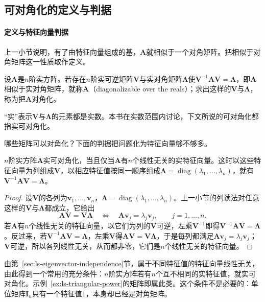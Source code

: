 \subsection{可对角化的定义与判据}

\paragraph{定义与特征向量判据}
上一小节说明，有了由特征向量组成的基，$\bm A$就相似于一个对角矩阵。把相似于对角矩阵这一性质取作定义。
\begin{definition}[实可对角化]
\label{def:ls-real-diagonalizable}
设$\bm A$是$n$阶实方阵。若存在$n$阶实可逆矩阵$\bm V$与实对角矩阵$\bm\Lambda$使$\bm V^{-1}\bm A\bm V=\bm\Lambda$，即$\bm A$相似于实对角矩阵，就称$\bm A$（diagonalizable over the reals）；求出这样的$\bm V$与$\bm\Lambda$，称为把$\bm A$对角化。
\end{definition}
“实”表示$\bm V$与$\bm\Lambda$的元素都是实数。本书在实数范围内讨论，下文所说的可对角化都指实可对角化。

哪些矩阵可以对角化？下面的判据把问题化为特征向量够不够多。
\begin{theorem}[对角化判据]
\label{thm:ls-diagonalization-criterion}
$n$阶实方阵$\bm A$实可对角化，当且仅当$\bm A$有$n$个线性无关的实特征向量。这时以这些特征向量为列组成$\bm V$，以相应特征值按同一顺序组成$\bm\Lambda=\operatorname{diag}(\lambda_1,\ldots,\lambda_n)$，就有$\bm V^{-1}\bm A\bm V=\bm\Lambda$。
\end{theorem}
\begin{proof}
设$\bm V$的各列为$\bm v_1,\ldots,\bm v_n$，$\bm\Lambda=\operatorname{diag}(\lambda_1,\ldots,\lambda_n)$。上一小节的列读法对任意这样的$\bm V$与$\bm\Lambda$都成立，它给出
\[
 \bm A\bm V=\bm V\bm\Lambda
 \quad\Longleftrightarrow\quad
 \bm A\bm v_j=\lambda_j\bm v_j,\qquad j=1,\ldots,n.
\]
若$\bm A$有$n$个线性无关的特征向量，以它们为列的$\bm V$可逆，左乘$\bm V^{-1}$即得$\bm V^{-1}\bm A\bm V=\bm\Lambda$。反过来，若$\bm V^{-1}\bm A\bm V=\bm\Lambda$，左乘$\bm V$得$\bm A\bm V=\bm V\bm\Lambda$，于是每列都满足$\bm A\bm v_j=\lambda_j\bm v_j$；$\bm V$可逆，所以各列线性无关，从而都非零，它们是$n$个线性无关的特征向量。
\end{proof}
由第~\ref{sec:ls-eigenvector-independence}节，属于不同特征值的特征向量线性无关，由此得到一个常用的充分条件：$n$阶实方阵若有$n$个互不相同的实特征值，就实可对角化。示例~\ref{ex:ls-triangular-power}的矩阵即属此类。这个条件不是必要的：单位矩阵$\bm I_n$只有一个特征值$1$，本身却已经是对角矩阵。

